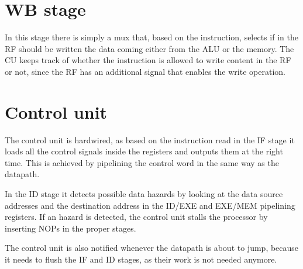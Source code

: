 \section{WB stage}
In this stage there is simply a mux that, based on the instruction, selects if in the RF should be written the data coming
either from the ALU or the memory. The CU keeps track of whether the instruction is allowed to write content in the RF or not,
since the RF has an additional signal that enables the write operation.

\section{Control unit}
The control unit is hardwired, as based on the instruction read in the IF stage it loads all the control signals inside the registers
and outputs them at the right time. This is achieved by pipelining the control word in the same way as the datapath.

In the ID stage it detects possible data hazards by looking at the data source addresses and the destination address in the ID/EXE and
EXE/MEM pipelining registers. If an hazard is detected, the control unit stalls the processor by inserting NOPs in the proper stages.

The control unit is also notified whenever the datapath is about to jump, because it needs to flush the IF and ID stages, as their
work is not needed anymore.
